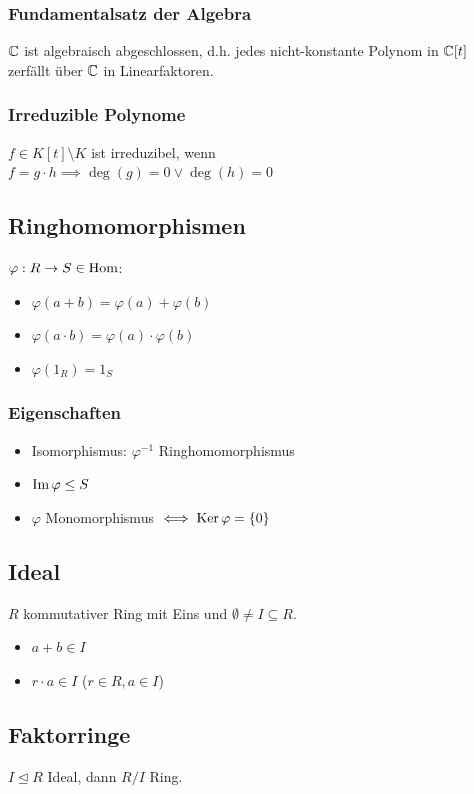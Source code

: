 \subsubsection*{Fundamentalsatz der Algebra}
$\mathbb{C}$ ist algebraisch abgeschlossen, d.h.
jedes nicht-konstante Polynom in $\mathbb{C}[t]$ zerfällt über $\mathbb{C}$ in Linearfaktoren.

\subsubsection*{Irreduzible Polynome}
$f\in K[t]\setminus K$ ist irreduzibel, wenn \\
$f=g\cdot h \implies \deg(g)=0 \lor \deg(h)=0$

\subsection*{Ringhomomorphismen}
$\varphi: R \to S \in \operatorname{Hom}$:
\begin{itemize}
	\item $\varphi(a+b) = \varphi(a) + \varphi(b)$
	\item $\varphi(a \cdot b) = \varphi(a) \cdot \varphi(b)$
	\item $\varphi(1_R) = 1_S$
\end{itemize}

\subsubsection*{Eigenschaften}
\begin{itemize}
	\item Isomorphismus: $\varphi^{-1}$ Ringhomomorphismus
	\item $\operatorname{Im}\varphi \le S$
	\item $\varphi$ Monomorphismus $\iff \operatorname{Ker}\varphi = \{0\}$
\end{itemize}

\subsection*{Ideal}
$R$ kommutativer Ring mit Eins und $\emptyset \neq I \subseteq R$.
\begin{itemize}
	\item $a+b \in I$
	\item $r \cdot a \in I$ ($r\in R, a \in I$)
\end{itemize}

\subsection*{Faktorringe}
$I \trianglelefteq R$ Ideal, dann $R/I$ Ring.
